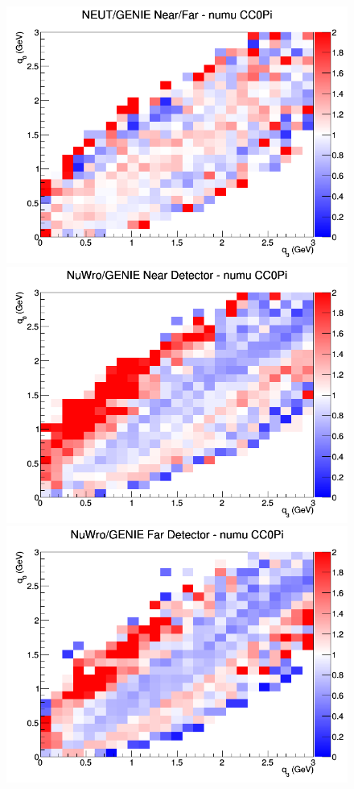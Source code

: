 \begin{figure}[h]
\endminipage
{}
\includegraphics[width=\linewidth]{eff_q0_q3/FGT/ratios/CC0Pi_NEUT_GENIE_numu_NF_q3_q0.png}
\endminipage
\newline
{}
\includegraphics[width=\linewidth]{eff_q0_q3/FGT/ratios/CC0Pi_NuWro_GENIE_numu_near_q3_q0.png}
\endminipage
{}
\includegraphics[width=\linewidth]{eff_q0_q3/FGT/ratios/CC0Pi_NuWro_GENIE_numu_far_q3_q0.png}

\end{figure}
